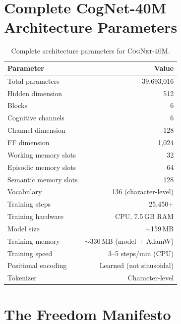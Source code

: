 \documentclass[11pt]{article}
\newcommand{\cognet}{\textsc{CogNet}}
\begin{document}
\section{Complete CogNet-40M Architecture Parameters}
\label{app:cognet-params}

\begin{table}[htbp]
\centering
\caption{Complete architecture parameters for \cognet{}-40M.}
\label{tab:cognet-params}
\begin{tabular}{@{}lr@{}}
\toprule
\textbf{Parameter} & \textbf{Value} \\
\midrule
Total parameters    & 39{,}693{,}016 \\
Hidden dimension    & 512 \\
Blocks              & 6 \\
Cognitive channels  & 6 \\
Channel dimension   & 128 \\
FF dimension        & 1{,}024 \\
Working memory slots  & 32 \\
Episodic memory slots & 64 \\
Semantic memory slots & 128 \\
Vocabulary          & 136 (character-level) \\
Training steps      & 25{,}450+ \\
Training hardware   & CPU, 7.5\,GB RAM \\
Model size          & $\sim$159\,MB \\
Training memory     & $\sim$330\,MB (model + AdamW) \\
Training speed      & 3--5 steps/min (CPU) \\
Positional encoding & Learned (not sinusoidal) \\
Tokenizer           & Character-level \\
\bottomrule
\end{tabular}
\end{table}

\section{The Freedom Manifesto}
\label{app:manifesto}
\end{document}
